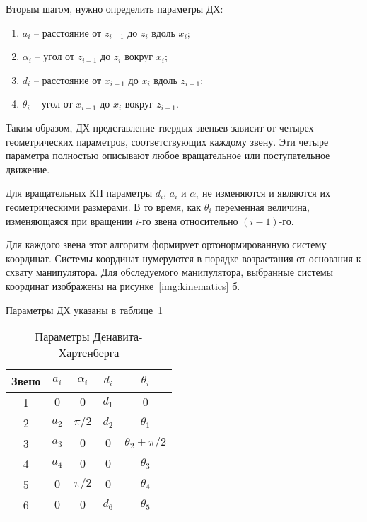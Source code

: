 Вторым шагом, нужно определить параметры ДХ:

\begin{enumerate}
	\item $a_i$ -- расстояние от $z_{i-1}$ до $z_i$ вдоль $x_i$;
	\item $\alpha_i$ -- угол от $z_{i-1}$ до $z_i$ вокруг $x_i$;
	\item $d_i$ -- расстояние от $x_{i-1}$ до $x_i$ вдоль $z_{i-1}$;
	\item $\theta_i$ -- угол от $x_{i-1}$ до $x_i$ вокруг $z_{i-1}$.
\end{enumerate}

Таким образом, ДХ-представление твердых звеньев зависит от четырех геометрических параметров, соответствующих каждому звену. Эти четыре параметра полностью описывают любое вращательное или поступательное движение. 

Для вращательных КП параметры $d_i$, $a_i$ и $\alpha_i$ не изменяются и являются их геометрическими размерами. В то время,  как $\theta_i$ переменная величина, изменяющаяся при вращении $i$-го звена относительно $(i-1)$-го.

Для каждого звена этот алгоритм формирует ортонормированную систему координат. Системы координат нумеруются в порядке возрастания от основания к схвату манипулятора. Для обследуемого манипулятора, выбранные системы координат изображены на рисунке~\ref{img:kinematics} б. 

Параметры ДХ указаны в таблице~\ref{table_DH_params}

\begin{table}[h!]
	\caption{Параметры Денавита-Хартенберга}
	\begin{center}
		\begin{tabular}{|c|c|c|c|c|}
			\hline
			Звено 	& $a_i$ & $\alpha_i$ & $d_i$ & $\theta_i$\\
			\hline
			1 		& $0$ & $0$ 	& $d_1$ & $0$\\
			\hline
			2  		& $a_2$ & $\pi/2$ & $d_2$ & $\theta_1$\\
			\hline	
			3 		& $a_3$ & $0$ 	& $0$ 	& $\theta_2+\pi/2$\\
			\hline
			4 		& $a_4$ & $0$ 	& $0$ 	& $\theta_3$\\
			\hline
			5 		& $0$ & $\pi/2$ & $0$ 	& $\theta_4$\\
			\hline
			6 		& $0$ & $0$ 	& $d_6$ & $\theta_5$\\
			\hline
		\end{tabular}
	\end{center}
	\label{table_DH_params}
\end{table}

